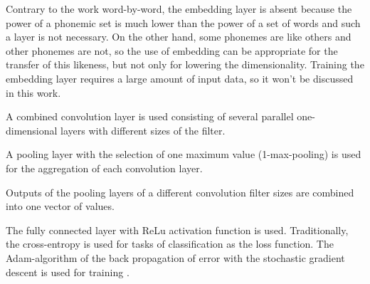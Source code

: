 Contrary to the work word-by-word, the embedding layer is absent because the power of a phonemic set is much lower than the power of a set of words and such a layer is not necessary. On the other hand, some phonemes are like others and other phonemes are not, so the use of embedding can be appropriate for the transfer of this likeness, but not only for lowering the dimensionality. Training the embedding layer requires a large amount of input data, so it won’t be discussed in this work. 

A combined convolution layer is used consisting of several parallel one-dimensional layers with different sizes of the filter. 

A pooling layer with the selection of one maximum value (1-max-pooling) is used for the aggregation of each convolution layer. 

Outputs of the pooling layers of a different convolution filter sizes are combined into one vector of values. 

The fully connected layer with ReLu activation function is used. Traditionally, the cross-entropy is used for tasks of classification as the loss function. The Adam-algorithm of the back propagation of error with the stochastic gradient descent is used for training \cite{art4}. 

